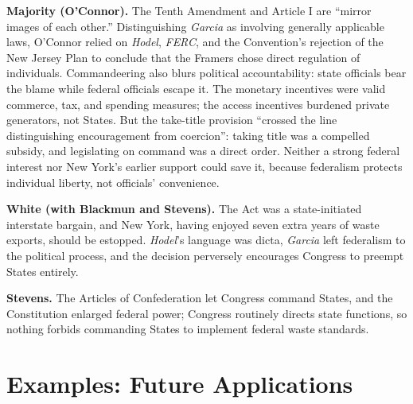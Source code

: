 \documentclass[12pt]{article}
\begin{document}
\textbf{Majority (O'Connor).} The Tenth Amendment and Article I are ``mirror images of each other.'' Distinguishing \textit{Garcia} as involving generally applicable laws, O'Connor relied on \textit{Hodel}, \textit{FERC}, and the Convention's rejection of the New Jersey Plan to conclude that the Framers chose direct regulation of individuals. Commandeering also blurs political accountability: state officials bear the blame while federal officials escape it. The monetary incentives were valid commerce, tax, and spending measures; the access incentives burdened private generators, not States. But the take-title provision ``crossed the line distinguishing encouragement from coercion'': taking title was a compelled subsidy, and legislating on command was a direct order. Neither a strong federal interest nor New York's earlier support could save it, because federalism protects individual liberty, not officials' convenience.

\textbf{White (with Blackmun and Stevens).} The Act was a state-initiated interstate bargain, and New York, having enjoyed seven extra years of waste exports, should be estopped. \textit{Hodel}'s language was dicta, \textit{Garcia} left federalism to the political process, and the decision perversely encourages Congress to preempt States entirely.

\textbf{Stevens.} The Articles of Confederation let Congress command States, and the Constitution enlarged federal power; Congress routinely directs state functions, so nothing forbids commanding States to implement federal waste standards.

\section{Examples: Future Applications}
\end{document}
